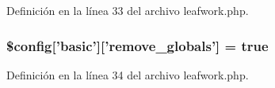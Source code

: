 Definición en la línea 33 del archivo leafwork.\-php.

\hypertarget{config_2leafwork_8php_a960f169c5af87b19aaf919499f37de03}{
\subsubsection[{\$config}]{\setlength{\rightskip}{0pt plus 5cm}\${\bf config}\mbox{[}'basic'\mbox{]}\mbox{[}'remove\-\_\-globals'\mbox{]} = true}}\label{config_2leafwork_8php_a960f169c5af87b19aaf919499f37de03}


Definición en la línea 34 del archivo leafwork.\-php.

